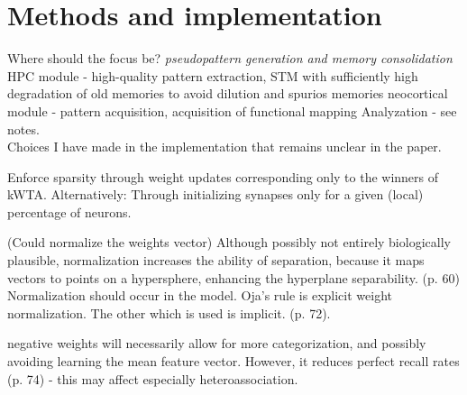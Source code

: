 
\chapter{Methods and implementation}\label{chpt:methods}
Where should the focus be? \textit{pseudopattern generation and memory consolidation}
HPC module - high-quality pattern extraction, STM with sufficiently high degradation of old memories to avoid dilution and spurios memories
neocortical module - pattern acquisition, acquisition of functional mapping
Analyzation - see notes.
\\

Choices I have made in the implementation that remains unclear in the paper.

Enforce sparsity through weight updates corresponding only to the winners of kWTA.
Alternatively: Through initializing synapses only for a given (local) percentage of neurons.

(Could normalize the weights vector)
Although possibly not entirely biologically plausible, normalization increases the ability of separation, because it maps vectors to points on a hypersphere, enhancing the hyperplane separability. (p. 60)
Normalization should occur in the model. Oja's rule is explicit weight normalization. The other which is used is implicit. (p. 72).

negative weights will necessarily allow for more categorization, and possibly avoiding learning the mean feature vector. However, it reduces perfect recall rates (p. 74) - this may affect especially heteroassociation.